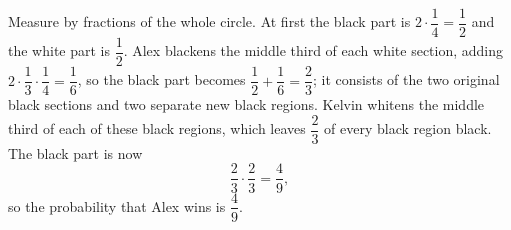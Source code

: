 Measure by fractions of the whole circle. At first the black part is $2\cdot\dfrac{1}{4}=\dfrac{1}{2}$ and the white part is $\dfrac{1}{2}$. Alex blackens the middle third of each white section, adding $2\cdot\dfrac{1}{3}\cdot\dfrac{1}{4}=\dfrac{1}{6}$, so the black part becomes $\dfrac{1}{2}+\dfrac{1}{6}=\dfrac{2}{3}$; it consists of the two original black sections and two separate new black regions. Kelvin whitens the middle third of each of these black regions, which leaves $\dfrac{2}{3}$ of every black region black. The black part is now
\[
\dfrac{2}{3}\cdot\dfrac{2}{3}=\dfrac{4}{9},
\]
so the probability that Alex wins is $\boxed{\dfrac{4}{9}}$.
